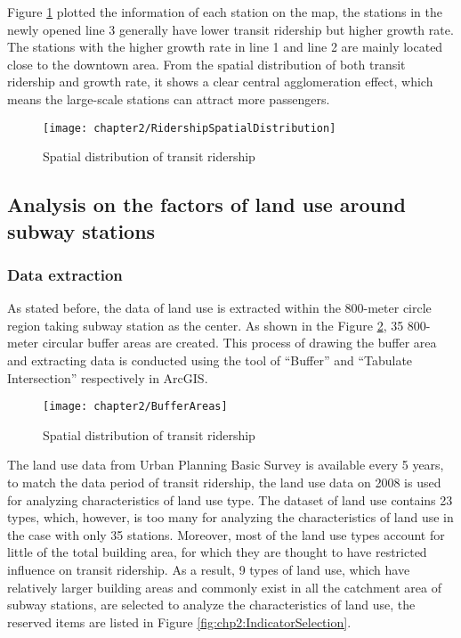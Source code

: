 %
Figure \ref{fig:chp2:RidershipSpatialDistribution} plotted the information of each station on the map, the stations in the newly opened line 3 generally have lower transit ridership but higher growth rate. The stations with the higher growth rate in line 1 and line 2 are mainly located close to the downtown area. From the spatial distribution of both transit ridership and growth rate, it shows a clear central agglomeration effect, which means the large-scale stations can attract more passengers.

%
\begin{figure}[htbp]
	\centering
	\texttt{[image: chapter2/RidershipSpatialDistribution]}
	\caption{Spatial distribution of transit ridership}
	\label{fig:chp2:RidershipSpatialDistribution}
\end{figure}

%
\subsection{Analysis on the factors of land use around subway stations}
%
\subsubsection{Data extraction}
%
As stated before, the data of land use is extracted within the 800-meter circle region taking subway station as the center. As shown in the Figure \ref{fig:chp2:BufferAreas}, 35 800-meter circular buffer areas are created. This process of drawing the buffer area and extracting data is conducted using the tool of “Buffer” and “Tabulate Intersection” respectively in ArcGIS.

%
\begin{figure}[htbp]
	\centering
	\texttt{[image: chapter2/BufferAreas]}
	\caption{Spatial distribution of transit ridership}
	\label{fig:chp2:BufferAreas}
\end{figure}

%
The land use data from Urban Planning Basic Survey is available every 5 years, to match the data period of transit ridership, the land use data on 2008 is used for analyzing characteristics of land use type. The dataset of land use contains 23 types, which, however, is too many for analyzing the characteristics of land use in the case with only 35 stations. Moreover, most of the land use types account for little of the total building area, for which they are thought to have restricted influence on transit ridership. As a result, 9 types of land use, which have relatively larger building areas and commonly exist in all the catchment area of subway stations, are selected to analyze the characteristics of land use, the reserved items are listed in Figure \ref{fig:chp2:IndicatorSelection}.

